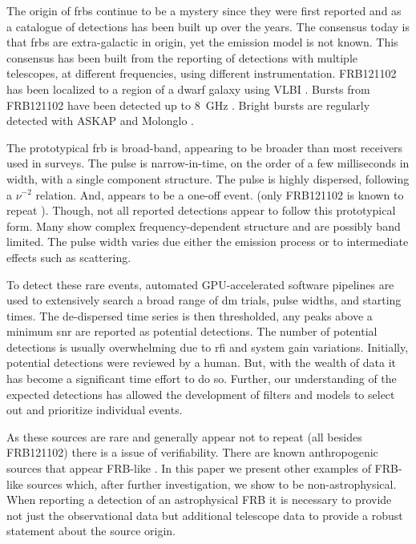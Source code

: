 \documentclass[a4paper,fleqn,usenatbib]{mnras}
\begin{document}
The origin of \glspl{frb} continue to be a mystery since they were first
reported \citep{2007Sci...318..777L} and as a catalogue of detections has been
built up over the years.  The consensus today is that \glspl{frb} are
extra-galactic in origin, yet the emission model is not known.  This consensus
has been built from the reporting of detections with multiple telescopes, at
different frequencies, using different instrumentation.  FRB121102 has been
localized to a region of a dwarf galaxy using VLBI
\citep{2017ApJ...834L...7T,2017Natur.541...58C}.  Bursts from FRB121102 have
been detected up to 8~GHz \citep{atel10675}.  Bright bursts are regularly
detected with ASKAP and Molonglo
\citep{2017ApJ...841L..12B,2017MNRAS.468.3746C,atel10693}. 

The prototypical \gls{frb} is broad-band, appearing to be broader than most
receivers used in surveys. The pulse is narrow-in-time, on the order of a few
milliseconds in width, with a single component structure. The pulse is highly
dispersed, following a $\nu^{-2}$ relation. And, appears to be a one-off event.
(only FRB121102 is known to repeat \citep{2016Natur.531..202S}).  Though, not
all reported detections appear to follow this prototypical form. Many show
complex frequency-dependent structure and are possibly band limited. The pulse
width varies due either the emission process or to intermediate effects such as
scattering.

To detect these rare events, automated GPU-accelerated software pipelines are
used to extensively search a broad range of \gls{dm} trials, pulse widths, and
starting times. The de-dispersed time series is then thresholded, any peaks
above a minimum \gls{snr} are reported as potential detections. The number of
potential detections is usually overwhelming due to \gls{rfi} and system gain
variations. Initially, potential detections were reviewed by a human. But, with
the wealth of data it has become a significant time effort to do so. Further,
our understanding of the expected detections has allowed the development of
filters and models to select out and prioritize individual events.

As these sources are rare
and generally appear not to repeat (all besides FRB121102) there is a issue
of verifiability. There are known anthropogenic sources that appear FRB-like
\citep{2011ApJ...727...18B}. In this paper we present other examples of FRB-like
sources which, after further investigation, we show to be non-astrophysical.
When reporting a detection of an astrophysical FRB it is necessary to provide
not just the observational data but additional telescope data to provide a
robust statement about the source origin.
\end{document}
